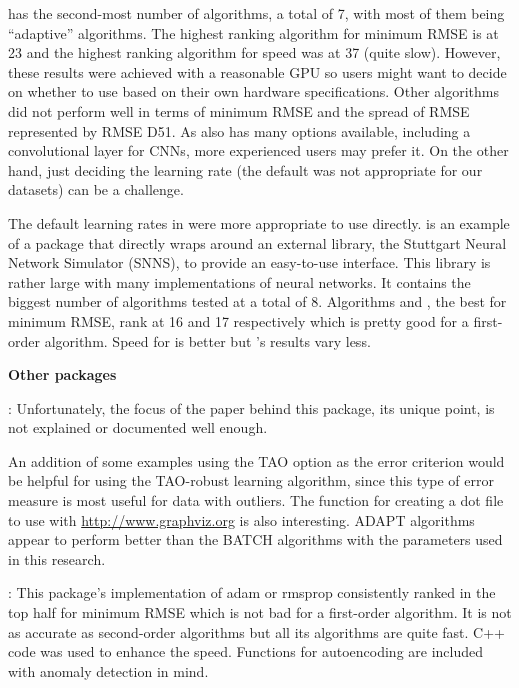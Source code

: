  has the second-most number of algorithms, a total of 7, with
most of them being ``adaptive'' algorithms. The highest ranking
algorithm for minimum RMSE is  at 23 and the highest
ranking algorithm for speed was  at 37 (quite slow).
However, these results were achieved with a reasonable GPU so users
might want to decide on whether to use  based on their own
hardware specifications. Other algorithms did not perform well in terms
of minimum RMSE and the spread of RMSE represented by RMSE D51. As
 also has many options available, including a convolutional
layer for CNNs, more experienced users may prefer it. On the other hand,
just deciding the learning rate (the default was not appropriate for our
datasets) can be a challenge.

The default learning rates in  \citep{R-RSNNS} were more
appropriate to use directly.  is an example of a package that
directly wraps around an external library, the Stuttgart Neural Network
Simulator (SNNS), to provide an easy-to-use interface. This library is
rather large with many implementations of neural networks. It contains
the biggest number of algorithms tested at a total of 8. Algorithms
 and , the best for minimum RMSE, rank at 16 and
17 respectively which is pretty good for a first-order algorithm. Speed
for  is better but 's results vary less.

\textbf{Other packages }

 \citep{R-AMORE}: Unfortunately, the focus of the paper
behind this package, its unique point, is not explained or documented
well enough.

An addition of some examples using the TAO option as the error criterion
would be helpful for using the TAO-robust learning algorithm, since this
type of error measure is most useful for data with outliers. The
function for creating a dot file to use with
\url{http://www.graphviz.org} is also interesting. ADAPT algorithms
appear to perform better than the BATCH algorithms with the parameters
used in this research.

 \citep{R-ANN2}: This package's implementation of adam or
rmsprop consistently ranked in the top half for minimum RMSE which is
not bad for a first-order algorithm. It is not as accurate as
second-order algorithms but all its algorithms are quite fast. C++ code
was used to enhance the speed. Functions for autoencoding are included
with anomaly detection in mind.

